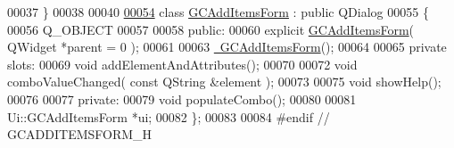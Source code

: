 \begin{DoxyCode}
00037 \}
00038 
00040 
\hypertarget{gcadditemsform_8h_source_l00054}{}\hyperlink{class_g_c_add_items_form}{00054} \textcolor{keyword}{class }\hyperlink{class_g_c_add_items_form}{GCAddItemsForm} : \textcolor{keyword}{public} QDialog
00055 \{
00056   Q\_OBJECT
00057   
00058 \textcolor{keyword}{public}:
00060   \textcolor{keyword}{explicit} \hyperlink{class_g_c_add_items_form_adfd8359e3e47a03741efee4e2be3d229}{GCAddItemsForm}( QWidget *parent = 0 );
00061 
00063   \hyperlink{class_g_c_add_items_form_adbcd4fa77a2c1c345fd08e2333a45102}{~GCAddItemsForm}();
00064   
00065 \textcolor{keyword}{private} slots:
00069   \textcolor{keywordtype}{void} addElementAndAttributes();
00070 
00072   \textcolor{keywordtype}{void} comboValueChanged( \textcolor{keyword}{const} QString &element );
00073 
00075   \textcolor{keywordtype}{void} showHelp();
00076 
00077 \textcolor{keyword}{private}:
00079   \textcolor{keywordtype}{void} populateCombo();
00080 
00081   Ui::GCAddItemsForm *ui;
00082 \};
00083 
00084 \textcolor{preprocessor}{#endif // GCADDITEMSFORM\_H}
\end{DoxyCode}
